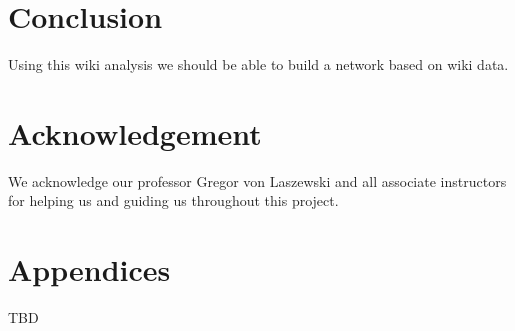 \documentclass[9pt,twocolumn,twoside]{styles/osajnl}
\begin{document}
\section{Conclusion}

Using this wiki analysis we should be able to build a network based on wiki data.

\section{Acknowledgement}

We acknowledge our professor Gregor von Laszewski and all associate instructors for helping us and guiding us throughout this project.

\section{Appendices}
TBD



 
\end{document}
